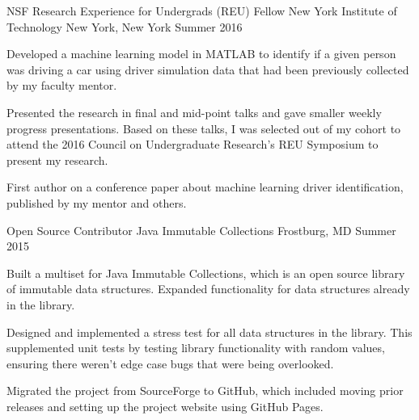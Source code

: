 \begin{cventries}
  \cventry
    {NSF Research Experience for Undergrads (REU) Fellow} %
    {New York Institute of Technology} %
    {New York, New York} %
    {Summer 2016} %
    {
      \begin{cvitems} %
        \item {Developed a machine learning model in MATLAB to identify if a given person was driving a car using driver simulation data that had been previously collected by my faculty mentor.}
        \item{Presented the research in final and mid-point talks and gave smaller weekly progress presentations. Based on these talks, I was selected out of my cohort to attend the 2016 Council on Undergraduate Research’s REU Symposium to present my research.}
        \item {First author on a conference paper about machine learning driver identification, published by my mentor and others.}
      \end{cvitems}
    }

  \cventry
    {Open Source Contributor} %
    {Java Immutable Collections} %
    {Frostburg, MD} %
    {Summer 2015} %
    {
      \begin{cvitems} %
        \item {Built a multiset for Java Immutable Collections, which is an open source library of immutable data structures. Expanded functionality for data structures already in the library.}
        \item {Designed and implemented a stress test for all data structures in the library. This supplemented unit tests by testing library functionality with random values, ensuring there weren't edge case bugs that were being overlooked.}
        \item {Migrated the project from SourceForge to GitHub, which included moving prior releases and setting up the project website using GitHub Pages.}
      \end{cvitems}
    }
\end{cventries}
